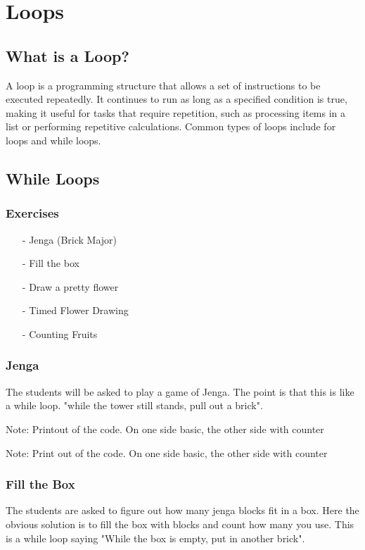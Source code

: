 \section{Loops}
\subsection{What is a Loop?}
A loop is a programming structure that allows a set of instructions to be executed repeatedly. It continues to run as long as a specified condition is true, making it useful for tasks that require repetition, such as processing items in a list or performing repetitive calculations. Common types of loops include for loops and while loops.


\subsection{While Loops}

\subsubsection{Exercises}
\begin{itemize}
    \item [-] Jenga (Brick Major)
    \item [-] Fill the box
    \item [-] Draw a pretty flower
    \item [-] Timed Flower Drawing
    \item [-] Counting Fruits
\end{itemize}

\subsubsection{Jenga}

The students will be asked to play a game of Jenga. The point is that this is like a while loop. "while the tower still stands, pull out a brick". 

Note: Printout of the code. On one side basic, the other side with counter

Note: Print out of the code. On one side basic, the other side with counter



\subsubsection{Fill the Box}

The students are asked to figure out how many jenga blocks fit in a box. Here the obvious solution is to fill the box with blocks and count how many you use. This is a while loop saying "While the box is empty, put in another brick". 

